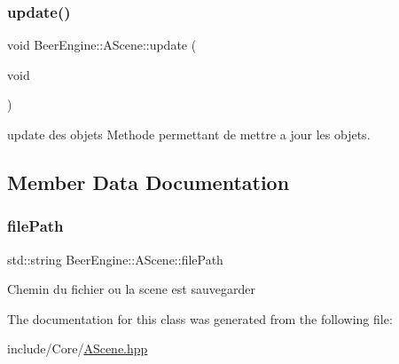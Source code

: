 \mbox{\label{class_beer_engine_1_1_a_scene_aee4c99b65b3e54bdcb62cc1096dcb397}} 
\subsubsection{\texorpdfstring{update()}{update()}}
{\footnotesize\ttfamily void Beer\+Engine\+::\+A\+Scene\+::update (\begin{DoxyParamCaption}\item[{void}]{ }\end{DoxyParamCaption})}



update des objets Methode permettant de mettre a jour les objets. 



\subsection{Member Data Documentation}
\mbox{\label{class_beer_engine_1_1_a_scene_a2edf1030b7232a5f703d327976f1d4ea}} 
\subsubsection{\texorpdfstring{file\+Path}{filePath}}
{\footnotesize\ttfamily std\+::string Beer\+Engine\+::\+A\+Scene\+::file\+Path}

Chemin du fichier ou la scene est sauvegarder 

The documentation for this class was generated from the following file\+:\begin{DoxyCompactItemize}
\item 
include/\+Core/\mbox{\hyperlink{_a_scene_8hpp}{A\+Scene.\+hpp}}\end{DoxyCompactItemize}
